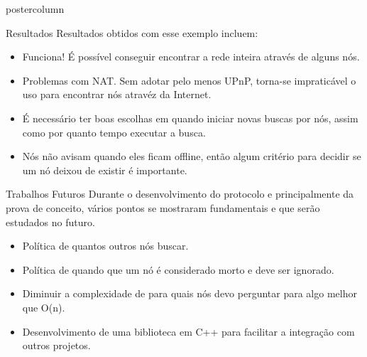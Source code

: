 \documentclass[final]{beamer}
\begin{document}
\begin{frame}
\begin{columns}
\begin{column}{.5\textwidth}
\begin{beamercolorbox}[center,wd=\textwidth]{postercolumn}
\begin{minipage}[T]{.95\textwidth}
{\begin{block}{Resultados}
                Resultados obtidos com esse exemplo incluem:
                \begin{itemize}
                  \item Funciona! É possível conseguir encontrar a rede inteira através de alguns nós.
                  \item Problemas com NAT. Sem adotar pelo menos UPnP, torna-se impraticável o uso para encontrar nós atravéz da Internet.
                  \item É necessário ter boas escolhas em quando iniciar novas buscas por nós, assim como por quanto tempo executar a busca.
                  \item Nós não avisam quando eles ficam offline, então algum critério para decidir se um nó deixou de existir é importante.
                \end{itemize}
                
                \vspace*{0.2cm}
            \end{block}
            
            \vspace*{0.2cm} 
            \begin{block}{Trabalhos Futuros}
                Durante o desenvolvimento do protocolo e principalmente da prova de conceito, vários pontos se mostraram fundamentais e que serão estudados no futuro.
                
                \begin{itemize}
                  \item Política de quantos outros nós buscar.
                  \item Política de quando que um nó é considerado morto e deve ser ignorado.
                  \item Diminuir a complexidade de para quais nós devo perguntar para algo melhor que O(n).
                  \item Desenvolvimento de uma biblioteca em C++ para facilitar a integração com outros projetos.
                \end{itemize}
                
                \vspace*{0.2cm} 
                
            \end{block}
            
}
\end{minipage}
\end{beamercolorbox}
\end{column}
\end{columns}
\end{frame}
\end{document}
